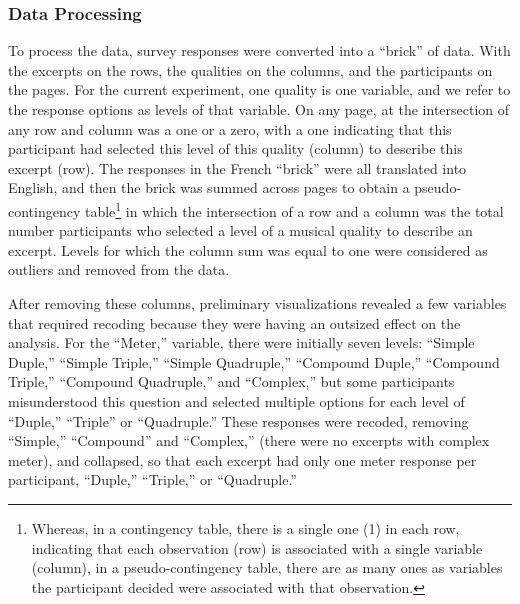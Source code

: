 \documentclass[
  english,
  man,floatsintext]{apa6}
\begin{document}
\hypertarget{data-processing}{%
\subsubsection{Data Processing}\label{data-processing}}

To process the data, survey responses were converted into a ``brick'' of data. With the excerpts on the rows, the qualities on the columns, and the participants on the pages. For the current experiment, one quality is one variable, and we refer to the response options as levels of that variable. On any page, at the intersection of any row and column was a one or a zero, with a one indicating that this participant had selected this level of this quality (column) to describe this excerpt (row). The responses in the French ``brick'' were all translated into English, and then the brick was summed across pages to obtain a pseudo-contingency table\footnote{Whereas, in a contingency table, there is a single one (1) in each row, indicating that each observation (row) is associated with a single variable (column), in a pseudo-contingency table, there are as many ones as variables the participant decided were associated with that observation.} in which the intersection of a row and a column was the total number participants who selected a level of a musical quality to describe an excerpt. Levels for which the column sum was equal to one were considered as outliers and removed from the data.

After removing these columns, preliminary visualizations revealed a few variables that required recoding because they were having an outsized effect on the analysis. For the ``Meter,'' variable, there were initially seven levels: ``Simple Duple,'' ``Simple Triple,'' ``Simple Quadruple,'' ``Compound Duple,'' ``Compound Triple,'' ``Compound Quadruple,'' and ``Complex,'' but some participants misunderstood this question and selected multiple options for each level of ``Duple,'' ``Triple'' or ``Quadruple.'' These responses were recoded, removing ``Simple,'' ``Compound'' and ``Complex,'' (there were no excerpts with complex meter), and collapsed, so that each excerpt had only one meter response per participant, ``Duple,'' ``Triple,'' or ``Quadruple.''
\end{document}

